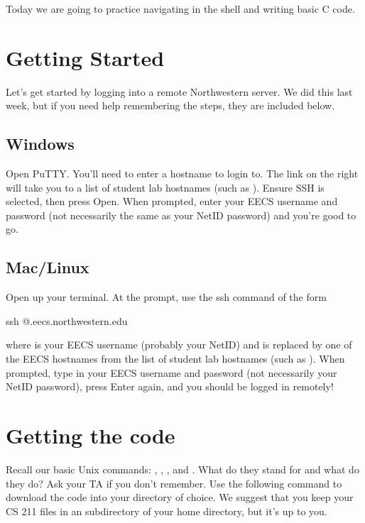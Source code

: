\documentclass{tufte-handout}
\begin{document}
\maketitle

Today we are going to practice navigating in the shell and writing basic C code. 

\section{Getting Started}
Let's get started by logging into a remote Northwestern server. We did
this last week, but if you need help remembering the steps, they are
included below.

\subsection{Windows}
Open PuTTY. You'll need to enter a hostname to login to. The link on the right will take you to a list of student lab hostnames (such as ).  Ensure SSH is selected, then press Open. When prompted, enter your EECS username and password (not necessarily the same as your NetID password) and you're good to go.

\subsection{Mac/Linux}
Open up your terminal. At the prompt, use the ssh command of the form
\begin{CmdLine}
  \prompt ssh @.eecs.northwestern.edu
\end{CmdLine}
\noindent where  is your EECS username (probably your NetID)
and  is replaced by one of the EECS hostnames from the list
of student lab hostnames (such as
).
When prompted, type in your EECS username and password (not necessarily your NetID password), press
Enter again, and you should be logged in remotely!

\section{Getting the code}
Recall our basic Unix commands: , , , and . What do they stand for and what do they do? Ask your TA if you don't remember. Use the following  command to download the code into your directory of choice. We suggest that you keep your CS 211 files in an  subdirectory of your home directory, but it's up to you.
\end{document}
